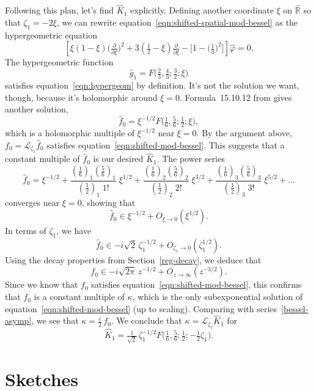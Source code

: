 \documentclass{article}
\newcommand{\R}{\mathbb{R}}
\newcommand{\laplace}{\mathcal{L}}
\begin{document}
Following this plan, let's find $\hat{K}_1$ explicitly. Defining another coordinate $\xi$ on $\hat{\R}$ so that $\zeta_1 = -2\xi$, we can rewrite equation~\ref{eqn:shifted-spatial-mod-bessel} as the hypergeometric equation
\begin{equation}\label{eqn:hypergeom}
\left[\xi(1 - \xi) \big(\tfrac{\partial}{\partial \xi}\big)^2 + 3(\tfrac{1}{2} - \xi) \tfrac{\partial}{\partial \xi} - \big[1 - \big(\tfrac{1}{3}\big)^2\big]\right] \hat{\varphi} = 0.
\end{equation}
The hypergeometric function
\[ \hat{g}_1 = F\big(\tfrac{2}{3}, \tfrac{4}{3}; \tfrac{3}{2}; \xi\big) \]
satisfies equation~\ref{eqn:hypergeom} by definition. It's not the solution we want, though, because it's holomorphic around $\xi = 0$. Formula~15.10.12 from \cite{dlmf} gives another solution,
\[ \hat{f}_0 = \xi^{-1/2} F\big(\tfrac{1}{6}, \tfrac{5}{6}; \tfrac{1}{2}; \xi\big), \]
which is a holomorphic multiple of $\xi^{-1/2}$ near $\xi = 0$. By the argument above, $f_0 = \laplace_{\zeta_1} \hat{f}_0$ satisfies equation~\ref{eqn:shifted-mod-bessel}. This suggests that a constant multiple of $\hat{f}_0$ is our desired $\hat{K}_1$. The power series~\cite[equation~15.2.1]{dlmf}
\[ \hat{f}_0 = \xi^{-1/2} + \frac{(\tfrac{1}{6})_1 (\tfrac{5}{6})_1}{(\tfrac{1}{2})_1 \; 1!}\;\xi^{1/2} + \frac{(\tfrac{1}{6})_2 (\tfrac{5}{6})_2}{(\tfrac{1}{2})_2 \; 2!}\;\xi^{3/2} + \frac{(\tfrac{1}{6})_3 (\tfrac{5}{6})_3}{(\tfrac{1}{2})_3 \; 3!}\;\xi^{5/2} + \ldots \]
converges near $\xi = 0$, showing that
\[ \hat{f}_0 \in \xi^{-1/2} + O_{\xi \to 0}(\xi^{1/2}). \]
In terms of $\zeta_1$, we have
\[ \hat{f}_0 \in -i \sqrt{2}\,\zeta_1^{-1/2} + O_{\zeta_1 \to 0}(\zeta_1^{1/2}). \]
Using the decay properties from Section~\ref{reg-decay}, we deduce that
\[ f_0 \in -i \sqrt{2\pi}\,z^{-1/2} + O_{z \to \infty}(z^{-3/2}). \]
Since we know that $f_0$ satisfies equation~\ref{eqn:shifted-mod-bessel}, this confirms that $f_0$ is a constant multiple of $\kappa$, which is the only subexponential solution of equation~\ref{eqn:shifted-mod-bessel} (up to scaling). Comparing with series~\ref{bessel-asymp}, we see that $\kappa = \tfrac{i}{2}\,f_0$. We conclude that $\kappa = \laplace_{\zeta_1} \hat{K}_1$ for
\[ \hat{K}_1 = \tfrac{1}{\sqrt{2}}\,\zeta_1^{-1/2} F\big(\tfrac{1}{6}, \tfrac{5}{6}; \tfrac{1}{2}; -\tfrac{1}{2}\zeta_1\big). \]
\section{Sketches}
\end{document}
